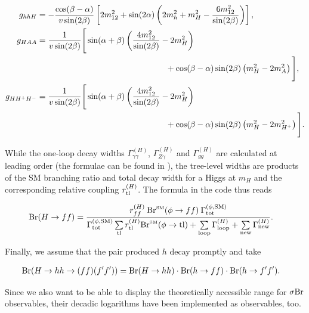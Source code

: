 \documentclass[preprint,3p,12pt]{elsarticle}
\begin{document}
\begin{align}
 g_{hhH} &= -\frac{\cos(\beta-\alpha)}{v \sin (2\beta)} \left[ 2 m_{12}^2 +\sin (2\alpha) \left( 2 m_h^2 + m_H^2 - \frac{6 m_{12}^2}{\sin (2\beta)} \right) \right] ,\nonumber \\
 g_{HAA} &= \frac{1}{v \sin (2\beta)} \Bigg[ \sin(\alpha+\beta) \left( \frac{4 m_{12}^2}{\sin (2\beta)} -2 m_H^2 \right) \phantom{\Bigg]}\nonumber \\
 & \hspace*{150pt} \phantom{\Bigg[} + \cos(\beta-\alpha) \sin (2\beta) \left( m_H^2 -2 m_A^2 \right) \Bigg] ,\nonumber \\
 g_{HH^+H^-} &= \frac{1}{v \sin (2\beta)} \Bigg[ \sin(\alpha+\beta) \left( \frac{4 m_{12}^2}{\sin (2\beta)} -2 m_H^2 \right) \phantom{\Bigg]}\nonumber \\
 & \hspace*{150pt} \phantom{\Bigg[} +\cos(\beta-\alpha) \sin (2\beta) \left( m_H^2 -2 m_{H^+}^2 \right) \Bigg] .\nonumber
\end{align}


While the one-loop decay widths $\Gamma_{\gamma \gamma}^{(H)}$, $\Gamma_{Z \gamma}^{(H)}$ and $\Gamma_{gg}^{(H)}$ are calculated at leading order (the formulae can be found in \cite{Gunion:1989we}), the tree-level widths are products of the SM branching ratio and total decay width for a Higgs at $m_H$ and the corresponding relative coupling $r_{\rm tl}^{(H)}$.
The formula in the code thus reads

\begin{align}
 {\rm Br}(H\to ff) &= \frac{r_{ff}^{(H)} \: {\rm Br}^{\text{\tiny{SM}}} (\phi \to ff) \: \Gamma^{(\phi ,\text{SM})}_{\text{tot}}}{\Gamma^{(\phi ,\text{SM})}_{\text{tot}} \sum\limits_{\rm tl} r_{\rm tl}^{(H)} {\rm Br}^{\text{\tiny{SM}}} (\phi \to {\rm tl}) + \sum\limits_{\rm loop} \Gamma_{\rm loop}^{(H)} + \sum\limits_{\rm new} \Gamma_{\rm new}^{(H)}} \nonumber .
\end{align}

Finally, we assume that the pair produced $h$ decay promptly and take

\begin{align}
 {\rm Br}(H\to hh\to (ff)(f'f')) &=  {\rm Br}(H\to hh)  \cdot {\rm Br}(h\to ff)  \cdot {\rm Br}(h\to f'f')\nonumber .
\end{align}

Since we also want to be able to display the theoretically accessible range for $\sigma {\rm Br}$ observables, their decadic logarithms have been implemented as observables, too.
\end{document}
